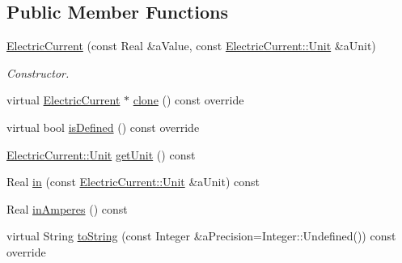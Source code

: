 \subsection*{Public Member Functions}
\begin{DoxyCompactItemize}
\item 
\hyperlink{classlibrary_1_1physics_1_1units_1_1_electric_current_a30529d17d2cd54e748ad21cae5b5d18d}{Electric\+Current} (const Real \&a\+Value, const \hyperlink{classlibrary_1_1physics_1_1units_1_1_electric_current_a9498eabf964f0ae6116eb627b4ec5233}{Electric\+Current\+::\+Unit} \&a\+Unit)
\begin{DoxyCompactList}\small\item\em Constructor. \end{DoxyCompactList}\item 
virtual \hyperlink{classlibrary_1_1physics_1_1units_1_1_electric_current}{Electric\+Current} $\ast$ \hyperlink{classlibrary_1_1physics_1_1units_1_1_electric_current_a3bde9c5bfa0834e43428a28c7059e32f}{clone} () const override
\item 
virtual bool \hyperlink{classlibrary_1_1physics_1_1units_1_1_electric_current_a52796b966074a631c569ac93d22869af}{is\+Defined} () const override
\item 
\hyperlink{classlibrary_1_1physics_1_1units_1_1_electric_current_a9498eabf964f0ae6116eb627b4ec5233}{Electric\+Current\+::\+Unit} \hyperlink{classlibrary_1_1physics_1_1units_1_1_electric_current_a78bb19afd6af8014474cc64826bc08f3}{get\+Unit} () const
\item 
Real \hyperlink{classlibrary_1_1physics_1_1units_1_1_electric_current_a27486b982c39f38961d59f734c06592f}{in} (const \hyperlink{classlibrary_1_1physics_1_1units_1_1_electric_current_a9498eabf964f0ae6116eb627b4ec5233}{Electric\+Current\+::\+Unit} \&a\+Unit) const
\item 
Real \hyperlink{classlibrary_1_1physics_1_1units_1_1_electric_current_aef34ed065d592d3becc8cf015a97a67f}{in\+Amperes} () const
\item 
virtual String \hyperlink{classlibrary_1_1physics_1_1units_1_1_electric_current_ab2325214012e6f50350a0dec575d877f}{to\+String} (const Integer \&a\+Precision=Integer\+::\+Undefined()) const override
\end{DoxyCompactItemize}
